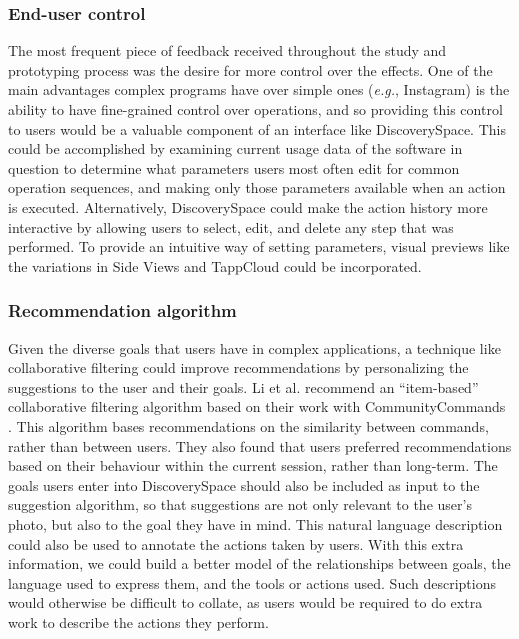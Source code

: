 \subsubsection{End-user control}
The most frequent piece of feedback received throughout the study and prototyping process was the desire for more control over the effects. One of the main advantages complex programs have over simple ones (\textit{e.g.}, Instagram) is the ability to have fine-grained control over operations, and so providing this control to users would be a valuable component of an interface like Discovery\-Space. This could be accomplished by examining current usage data of the software in question to determine what parameters users most often edit for common operation sequences, and making only those parameters available when an action is executed. Alternatively, Discovery\-Space could make the action history more interactive by allowing users to select, edit, and delete any step that was performed. To provide an intuitive way of setting parameters, visual previews like the variations in Side Views \cite{Terry2002} and TappCloud \cite{Laput2012} could be incorporated. 

\subsubsection{Recommendation algorithm}
Given the diverse goals that users have in complex applications, a technique like collaborative filtering could improve recommendations by personalizing the suggestions to the user and their goals. Li et al. recommend an ``item-based'' collaborative filtering algorithm based on their work with CommunityCommands \cite{Li2011}. This algorithm bases recommendations on the similarity between commands, rather than between users. They also found that users preferred recommendations based on their behaviour within the current session, rather than long-term. The goals users enter into Discovery\-Space should also be included as input to the suggestion algorithm, so that suggestions are not only relevant to the user's photo, but also to the goal they have in mind. This natural language description could also be used to annotate the actions taken by users. With this extra information, we could build a better model of the relationships between goals, the language used to express them, and the tools or actions used. Such descriptions would otherwise be difficult to collate, as users would be required to do extra work to describe the actions they perform.

